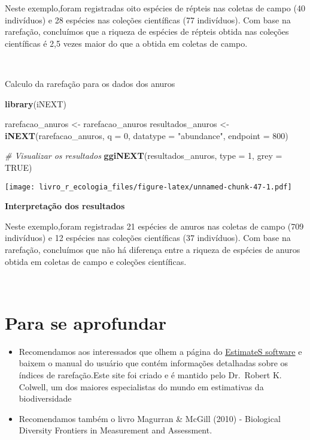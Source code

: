 \documentclass[
]{book}
\newenvironment{Shaded}{\begin{snugshade}}{\end{snugshade}}
\newcommand{\CommentTok}[1]{\textcolor[rgb]{0.56,0.35,0.01}{\textit{#1}}}
\newcommand{\DataTypeTok}[1]{\textcolor[rgb]{0.13,0.29,0.53}{#1}}
\newcommand{\DecValTok}[1]{\textcolor[rgb]{0.00,0.00,0.81}{#1}}
\newcommand{\KeywordTok}[1]{\textcolor[rgb]{0.13,0.29,0.53}{\textbf{#1}}}
\newcommand{\NormalTok}[1]{#1}
\newcommand{\OtherTok}[1]{\textcolor[rgb]{0.56,0.35,0.01}{#1}}
\newcommand{\StringTok}[1]{\textcolor[rgb]{0.31,0.60,0.02}{#1}}
\begin{document}
Neste exemplo,foram registradas oito espécies de répteis nas coletas de campo (40 indivíduos) e 28 espécies nas coleções científicas (77 indivíduos). Com base na rarefação, concluímos que a riqueza de espécies de répteis obtida nas coleções científicas é 2,5 vezes maior do que a obtida em coletas de campo.

~

Calculo da rarefação para os dados dos anuros

\begin{Shaded}
\begin{Highlighting}[]
\KeywordTok{library}\NormalTok{(iNEXT)}

\NormalTok{rarefacao_anuros <-}\StringTok{ }\NormalTok{rarefacao_anuros}
\NormalTok{resultados_anuros <-}\StringTok{ }\KeywordTok{iNEXT}\NormalTok{(rarefacao_anuros, }\DataTypeTok{q =} \DecValTok{0}\NormalTok{, }\DataTypeTok{datatype =} \StringTok{"abundance"}\NormalTok{, }\DataTypeTok{endpoint =} \DecValTok{800}\NormalTok{)}

\CommentTok{# Visualizar os resultados }
\KeywordTok{ggiNEXT}\NormalTok{(resultados_anuros, }\DataTypeTok{type =} \DecValTok{1}\NormalTok{, }\DataTypeTok{grey =} \OtherTok{TRUE}\NormalTok{)}
\end{Highlighting}
\end{Shaded}

\texttt{[image: livro\_r\_ecologia\_files/figure-latex/unnamed-chunk-47-1.pdf]}

\textbf{Interpretação dos resultados}

Neste exemplo,foram registradas 21 espécies de anuros nas coletas de campo (709 indivíduos) e 12 espécies nas coleções científicas (37 indivíduos). Com base na rarefação, concluímos que não há diferença entre a riqueza de espécies de anuros obtida em coletas de campo e coleções científicas.

~

\hypertarget{para-se-aprofundar}{%
\section{Para se aprofundar}\label{para-se-aprofundar}}

\begin{itemize}
\item
  Recomendamos aos interessados que olhem a página do \href{http://viceroy.eeb.uconn.edu/estimates}{EstimateS software} e baixem o manual do usuário que contém informações detalhadas sobre os índices de rarefação.Este site foi criado e é mantido pelo Dr.~Robert K. Colwell, um dos maiores especialistas do mundo em estimativas da biodiversidade
\item
  Recomendamos também o livro Magurran \& McGill (2010) - Biological Diversity Frontiers in Measurement and Assessment.
\end{itemize}
\end{document}
